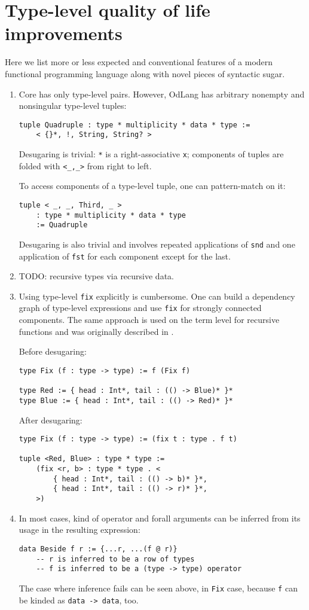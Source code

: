 \documentclass[a4paper,14pt]{extreport}
\begin{document}
\section{Type-level quality of life improvements}

Here we list more or less expected and conventional features of a modern
functional programming language along with novel pieces of syntactic sugar.

\begin{enumerate}
    \item Core has only type-level pairs. However, OdLang has arbitrary nonempty
        and nonsingular type-level tuples:
\begin{verbatim}
tuple Quadruple : type * multiplicity * data * type :=
    < {}*, !, String, String? >
\end{verbatim}
        Desugaring is trivial: \verb|*| is a right-associative \verb|x|;
        components of tuples are folded with \verb|<_,_>| from right to left.

        To access components of a type-level tuple, one can pattern-match on it:
\begin{verbatim}
tuple < _, _, Third, _ >
    : type * multiplicity * data * type
    := Quadruple
\end{verbatim}
        Desugaring is also trivial and involves repeated applications of
        \verb|snd| and one application of \verb|fst| for each component except
        for the last.
    \item TODO: recursive types via recursive data.
    \item Using type-level \verb|fix| explicitly is cumbersome. One can build a
        dependency graph of type-level expressions and use \verb|fix| for
        strongly connected components. The same approach is used on the term
        level for recursive functions and was originally described in
        \cite{spj}.

        Before desugaring:
\begin{verbatim}
type Fix (f : type -> type) := f (Fix f)

type Red := { head : Int*, tail : (() -> Blue)* }*
type Blue := { head : Int*, tail : (() -> Red)* }*
\end{verbatim}
        After desugaring:
\begin{verbatim}
type Fix (f : type -> type) := (fix t : type . f t)

tuple <Red, Blue> : type * type :=
    (fix <r, b> : type * type . <
        { head : Int*, tail : (() -> b)* }*,
        { head : Int*, tail : (() -> r)* }*,
    >)
\end{verbatim}
    \item In most cases, kind of operator and forall arguments can be inferred
        from its usage in the resulting expression:
\begin{verbatim}
data Beside f r := {...r, ...(f @ r)}
    -- r is inferred to be a row of types
    -- f is inferred to be a (type -> type) operator
\end{verbatim}
        The case where inference fails can be seen above, in \verb|Fix| case,
        because \verb|f| can be kinded as \verb|data -> data|, too.


\end{enumerate}
\end{document}

